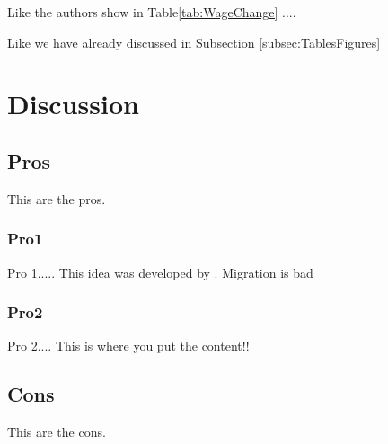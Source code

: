 \documentclass[12pt,a4paper]{article}
\begin{document}
Like the authors show in Table\ref{tab:WageChange} .... 


Like we have already discussed in Subsection \ref{subsec:TablesFigures}
\section{Discussion}



\subsection{Pros}
This are the pros.
\subsubsection{Pro1}
Pro 1.....
This idea was developed by \cite{borjas1994economics}. Migration is bad  \citep{borjas1994economics}
\subsubsection{Pro2}
Pro 2....
This is where you put the content!!
\subsection{Cons}
This are the cons.



\clearpage



\end{document}
